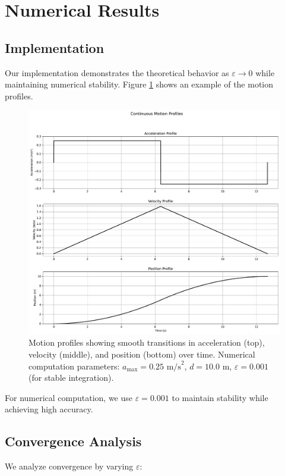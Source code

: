 \documentclass[12pt,a4paper]{article}
\begin{document}
\newpage
\section{Numerical Results}
\subsection{Implementation}
Our implementation demonstrates the theoretical behavior as $\varepsilon \to 0$ while maintaining numerical stability. Figure \ref{fig:profiles} shows an example of the motion profiles.

\begin{figure}[h]
\centering
\includegraphics[width=\textwidth]{motion_profiles.pdf}
\caption{Motion profiles showing smooth transitions in acceleration (top), velocity (middle), and position (bottom) over time. Numerical computation parameters: $a_{\text{max}} = 0.25 \text{ m/s}^2$, $d = 10.0 \text{ m}$, $\varepsilon = 0.001$ (for stable integration).}
\label{fig:profiles}
\end{figure}

For numerical computation, we use $\varepsilon = 0.001$ to maintain stability while achieving high accuracy.

\subsection{Convergence Analysis}
We analyze convergence by varying $\varepsilon$:
\end{document}
